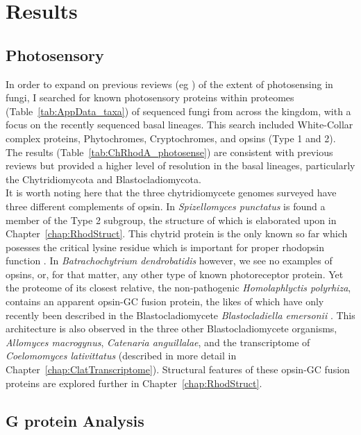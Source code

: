 \section{Results}
\subsection{Photosensory}
In order to expand on previous reviews (eg \cite{Idnurm2010}) of the extent of photosensing in fungi, I searched for known photosensory proteins within proteomes (Table~\ref{tab:AppData_taxa}) of sequenced fungi from across the kingdom, with a focus on the recently sequenced basal lineages. This search included White-Collar complex proteins, Phytochromes, Cryptochromes, and opsins (Type 1 and 2). The results (Table~\ref{tab:ChRhodA_photosense}) are consistent with previous reviews but provided a higher level of resolution in the basal lineages, particularly the Chytridiomycota and Blastocladiomycota.\\
\indent It is worth noting here that the three chytridiomycete genomes surveyed have three different complements of opsin. In \textit{Spizellomyces punctatus} is found a member of the Type 2 subgroup, the structure of which is elaborated upon in Chapter~\ref{chap:RhodStruct}. This chytrid protein is the only known so far which posesses the critical lysine residue which is important for proper rhodopsin function \cite{Smith2010}. In \textit{Batrachochytrium dendrobatidis} however, we see no examples of opsins, or, for that matter, any other type of known photoreceptor protein. Yet the proteome of its closest relative, the non-pathogenic \textit{Homolaphlyctis polyrhiza}, contains an apparent opsin-GC fusion protein, the likes of which have only recently been described in the Blastocladiomycete \textit{Blastocladiella emersonii} \cite{Avelar2014}. This architecture is also observed in the three other Blastocladiomycete organisms, \textit{Allomyces macrogynus}, \textit{Catenaria anguillalae}, and the transcriptome of \textit{Coelomomyces lativittatus} (described in more detail in Chapter~\ref{chap:ClatTranscriptome}). Structural features of these opsin-GC fusion proteins are explored further in Chapter~\ref{chap:RhodStruct}.\\
\subsection{G protein Analysis}
